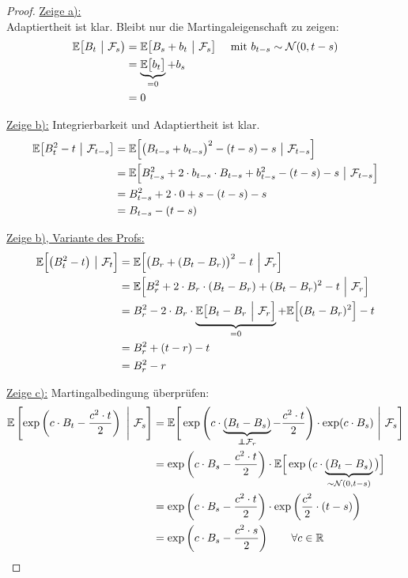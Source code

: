 \begin{proof}
	\underline{Zeige a):}\\
	Adaptiertheit ist klar.
	Bleibt nur die Martingaleigenschaft zu zeigen:
	\begin{align*}
		\mathbb{E}\big[B_t~\big|~\mathcal{F}_{s}\big)
		&=\mathbb{E}\big[B_{s}+b_t~\big|~\mathcal{F}_{s}\big]\quad\text{ mit } b_{t-s}\sim\mathcal{N}(0,t-s)\\
		&=\underbrace{\mathbb{E}\big[b_t\big]}_{=0}+b_s\\
		&=0
	\end{align*}

	\underline{Zeige b):}
	Integrierbarkeit und Adaptiertheit ist klar.
	\begin{align*}
		\mathbb{E}\big[B_t^2-t~\big|~\mathcal{F}_{t-s}\big]
		&=\mathbb{E}\Big[\big(B_{t-s}+b_{t-s}\big)^2-(t-s)-s~\big|~\mathcal{F}_{t-s}\Big]\\
		&=\mathbb{E}\Big[B_{t-s}^2+2\cdot b_{t-s}\cdot B_{t-s}+b_{t-s}^2-(t-s)-s~\big|~\mathcal{F}_{t-s}\Big]\\
		&=B_{t-s}^2+2\cdot0+s-(t-s)-s\\
		&=B_{t-s}-(t-s)
	\end{align*}
	
	\underline{Zeige b), Variante des Profs:}
	\begin{align*}
		\mathbb{E}\Big[\big(B_t^2-t\big)~\big|~\mathcal{F}_t\Big]
		&=\mathbb{E}\Big[\big(B_r+(B_t-B_r)\big)^2-t~\Big|~\mathcal{F}_r\Big]\\
		&=\mathbb{E}\Big[B_r^2+2\cdot B_r\cdot(B_t-B_r)+(B_t-B_r)^2-t~\Big|~\mathcal{F}_r\Big]\\
		&=B_r^2-2\cdot B_r\cdot\underbrace{\mathbb{E}\big[B_t-B_r~\Big|~\mathcal{F}_r\Big]}_{=0}+\mathbb{E}\Big[(B_t-B_r)^2\Big]-t\\
		&=B_r^2+(t-r)-t\\
		&=B_r^2-r
	\end{align*}

	\underline{Zeige c):}
	Martingalbedingung überprüfen:
	\begin{align*}
		\E\left[\exp\left(c\cdot B_t-\frac{c^2\cdot t}{2}\right)~\Bigg|~\F_s\right]
		&=\E\Bigg[\exp\Bigg(c\cdot \underbrace{(B_t-B_s)}_{\unab\F_r}-\frac{c^2\cdot t}{2}\Bigg)\cdot\exp(c\cdot B_s)~\Bigg|~\F_s\Bigg]\\
		&=\exp\left(c\cdot B_s-\frac{c^2\cdot t}{2}\right)\cdot\E\Big[\exp\big(c\cdot\underbrace{(B_t-B_s)}_{\sim\Nor(0,t-s)}\big)\Big]\\
		&=\exp\left(c\cdot B_s-\frac{c^2\cdot t}{2}\right)\cdot\exp\left(\frac{c^2}{2}\cdot(t-s)\right)\\
		&=\exp\left(c\cdot B_s-\frac{c^2\cdot s}{2}\right)\qquad\forall c\in\R
	\end{align*}
\end{proof}

